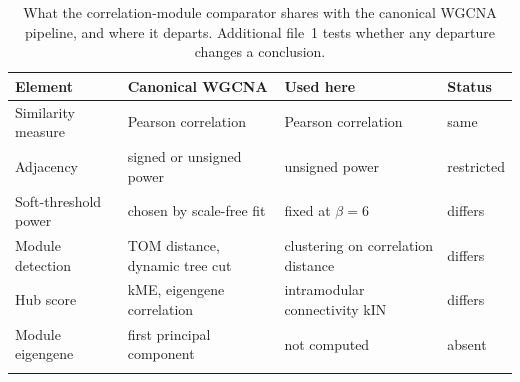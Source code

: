 \begin{table}[h]
\caption{What the correlation-module comparator shares with the canonical WGCNA pipeline, and where it departs. Additional file~1 tests whether any departure changes a conclusion.}\label{tab:comparator}
\footnotesize
\setlength{\tabcolsep}{4pt}
\begin{tabular}{@{}p{24mm}p{41mm}p{41mm}p{15mm}@{}}
\toprule
Element & Canonical WGCNA & Used here & Status \\
\midrule
Similarity measure & Pearson correlation & Pearson correlation & same \\
Adjacency & signed or unsigned power & unsigned power & restricted \\
Soft-threshold power & chosen by scale-free fit & fixed at $\beta = 6$ & differs \\
Module detection & TOM distance, dynamic tree cut & clustering on correlation distance & differs \\
Hub score & kME, eigengene correlation & intramodular connectivity kIN & differs \\
Module eigengene & first principal component & not computed & absent \\
\botrule
\end{tabular}
\end{table}
